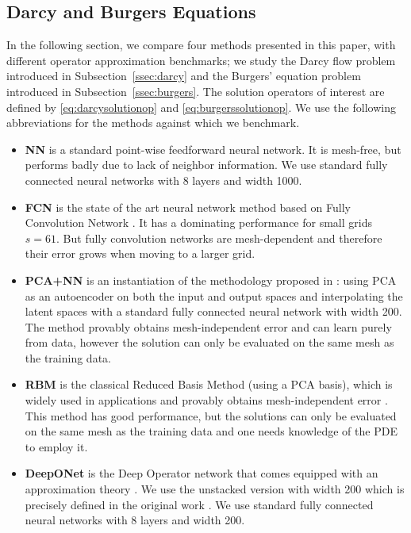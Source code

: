 
\subsection{Darcy and Burgers Equations}
\label{ssec:darcyburgers}




In the following section, we compare four methods presented in this paper, with different operator approximation benchmarks; we study the Darcy flow problem introduced in Subsection~\ref{ssec:darcy} and the Burgers' equation problem introduced in Subsection~\ref{ssec:burgers}. The solution operators of interest are defined by \eqref{eq:darcysolutionop}
and \eqref{eq:burgerssolutionop}. We use the following abbreviations for the methods against which we benchmark.

\begin{itemize}
    \item {\bf NN} is a standard point-wise feedforward neural network. It is mesh-free, but performs badly due to lack of neighbor information. We use standard fully connected neural networks with 8 layers and width 1000.
    \item {\bf FCN} is the state of the art neural network method based on Fully Convolution Network \citep{Zabaras}. It has a dominating performance for small grids $s=61$. But fully convolution networks are mesh-dependent and therefore their error grows when moving to a larger grid.
    \item {\bf PCA+NN} is an instantiation of the methodology proposed in \cite{Kovachki}: using PCA as an autoencoder on both the input and output spaces and interpolating the latent spaces with a standard fully connected neural network with width 200. The method provably obtains mesh-independent error and can learn purely from data, however the solution can only be evaluated on the same mesh as the training data.  
    \item {\bf RBM} is the classical Reduced Basis Method (using a PCA basis), which is widely used in applications and provably obtains mesh-independent error \citep{DeVoreReducedBasis}. This method has good performance, but the solutions can only be evaluated on the same mesh as the training data and one needs knowledge of the PDE to employ it.
    \item {\bf DeepONet} is the Deep Operator network \citep{lu2019deeponet} that comes equipped with an approximation theory \citep{lanthaler2021error}. We use the unstacked version with width 200 which is precisely defined in the original work \citep{lu2019deeponet}. We use standard fully connected neural networks with 8 layers and width 200. 
\end{itemize}

